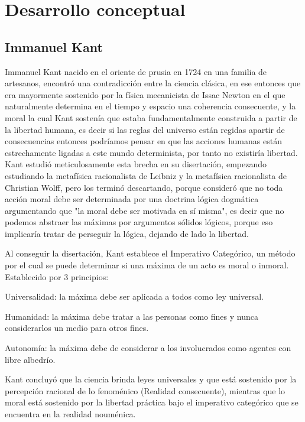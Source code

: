 \section{Desarrollo conceptual}

\subsection{Immanuel Kant}

Immanuel Kant nacido en el oriente de prusia en 1724 en una familia de artesanos, encontró una contradicción entre la ciencia clásica, en ese entonces que era mayormente sostenido por la física mecanicista de Issac Newton en el que naturalmente determina en el tiempo y espacio una coherencia consecuente, y la moral la cual Kant sostenía que estaba fundamentalmente construida a partir de la libertad humana, es decir si las reglas del universo están regidas apartir de consecuencias entonces podríamos pensar en que las acciones humanas están estrechamente ligadas a este mundo determinista, por tanto no existiría libertad. Kant estudió meticulosamente esta brecha en su disertación, empezando estudiando la metafísica racionalista de Leibniz y la metafísica racionalista de Christian Wolff, pero los terminó descartando, porque consideró que no toda acción moral debe ser determinada por una doctrina lógica dogmática argumentando que "la moral debe ser motivada en sí misma", es decir que no podemos abstraer las máximas por argumentos sólidos lógicos, porque eso implicaría tratar de perseguir la lógica, dejando de lado la libertad.

\medskip

Al conseguir la disertación, Kant establece el Imperativo Categórico, un método por el cual se puede determinar si una máxima de un acto es moral o inmoral. Establecido por 3 principios:

\medskip

Universalidad: la máxima debe ser aplicada a todos como ley universal.

\medskip

Humanidad: la máxima debe tratar a las personas como fines y nunca considerarlos un medio para otros fines.

\medskip

Autonomía: la máxima debe de considerar a los involucrados como agentes con libre albedrío.

\medskip

Kant concluyó que la ciencia brinda leyes universales y que está sostenido por la percepción racional de lo fenoménico (Realidad consecuente), mientras que lo moral está sostenido por la libertad práctica bajo el imperativo categórico que se encuentra en la realidad nouménica.

